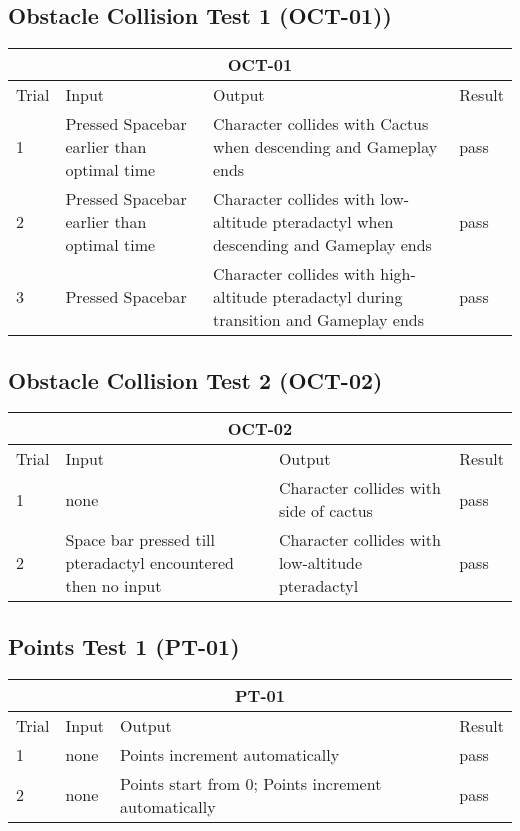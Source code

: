 \documentclass[12pt, titlepage]{article}
\begin{document}
\subsection{Obstacle Collision Test 1 (OCT-01))}
\begin{tabular}{ |p{3cm}||p{3cm}|p{3cm}|p{3cm}|  }
 \hline
 \multicolumn{4}{|c|}{OCT-01} \\
 \hline
Trial & Input & Output & Result\\
 \hline
1 & Pressed Spacebar earlier than optimal time & Character collides with Cactus when descending and Gameplay ends &  pass\\
\midrule
2 & Pressed Spacebar earlier than optimal time & Character collides with low-altitude pteradactyl when descending and Gameplay ends & pass\\
\midrule
3 & Pressed Spacebar & Character collides with high-altitude pteradactyl during transition and Gameplay ends & pass\\
\hline
\end{tabular}

\subsection{Obstacle Collision Test 2 (OCT-02)}
\begin{tabular}{ |p{3cm}||p{3cm}|p{3cm}|p{3cm}|  }
 \hline
 \multicolumn{4}{|c|}{OCT-02} \\
 \hline
Trial & Input & Output & Result\\
 \hline
1 & none & Character collides with side of cactus &  pass\\
\midrule
2 & Space bar pressed till pteradactyl encountered then no input & Character collides with low-altitude pteradactyl & pass\\
 \hline
\end{tabular}

\subsection{Points Test 1 (PT-01)}
\begin{tabular}{ |p{3cm}||p{3cm}|p{3cm}|p{3cm}|  }
 \hline
 \multicolumn{4}{|c|}{PT-01} \\
 \hline
Trial & Input & Output & Result\\
 \hline
1 & none & Points increment automatically &  pass\\
\midrule
2 & none & Points start from 0; Points increment automatically &  pass\\
 \hline
\end{tabular}
\end{document}
